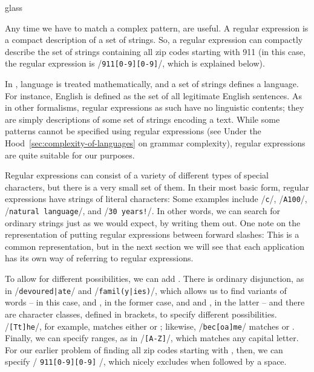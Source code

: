 \begin{tblsfilledsymbol}{}{glass} \label{regex}
\begin{underthehood} 
\newcommand{\A}{\texttt{\ensuremath{\,\hat{ }\,}}}

Any time we have to match a complex pattern,  are useful.  A regular expression is a compact
description of a set of strings.  So, a regular expression can
compactly describe the set of strings containing all zip codes
starting with 911 (in this case, the regular expression is
/\texttt{911[0-9][0-9]}/, which is explained below).

 In , language is treated mathematically, and a set of
strings defines a language.  For instance, English is defined as the
set of all legitimate English sentences.  As in other formalisms,
regular expressions as such have no linguistic contents; they are
simply descriptions of some set of strings encoding a  text.
While some patterns cannot be specified using regular expressions (see
Under the Hood~\ref{sec:complexity-of-languages} on grammar
complexity), regular expressions are quite suitable for our purposes.


Regular expressions can consist of a variety of different
types of special characters, but there is a very small set of them.
In their most basic form, regular expressions have strings of literal
characters: Some examples include /\texttt{c}/, /\texttt{A100}/,
/\texttt{natural language}/, and /\texttt{30 years!}/.  In other
words, we can search for ordinary strings just as we would expect, by
writing them out.  One note on the representation of putting regular
expressions between forward slashes: This is a common
representation, but in the next section we will see that each
application has its own way of referring to regular expressions.

To allow for different possibilities, we can add
.  There is ordinary disjunction, as in
/\texttt{devoured|ate}/ and /\texttt{famil(y|ies)}/, which allows us
to find variants of words -- in this case,  and
, in the former case, and  and
, in the latter -- and there are character classes,
defined in brackets, to specify different possibilities.
/\texttt{[Tt]he}/, for example, matches either  or
; likewise, /\texttt{bec[oa]me}/ matches 
or .  Finally, we can specify ranges, as in
/\texttt{[A-Z]}/, which matches any capital letter.  For our earlier
problem of finding all zip codes starting with , then, we
can specify / \texttt{911[0-9][0-9]} /, which nicely excludes
 when followed by a space.


\end{underthehood}
\end{tblsfilledsymbol}
